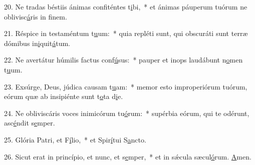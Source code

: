 20. Ne tradas béstiis ánimas confiténtes t\uline{i}bi,~* et ánimas páuperum tuórum ne oblivisc\uline{á}ris in f\uline{i}nem.\par 
21. Réspice in testaméntum t\uline{u}um:~* quia repléti sunt, qui obscuráti sunt terræ dómibus in\uline{i}quit\uline{á}tum.\par 
22. Ne avertátur húmilis factus conf\uline{ú}sus:~* pauper et inops laudábunt n\uline{o}men t\uline{u}um.\par 
23. Exsúrge, Deus, júdica causam t\uline{u}am:~* memor esto improperiórum tuórum, eórum quæ ab insipiénte sunt t\uline{o}ta d\uline{i}e.\par 
24. Ne obliviscáris voces inimicórum tu\uline{ó}rum:~* supérbia eórum, qui te odérunt, asc\uline{é}ndit s\uline{e}mper.\par 
25. Glória Patri, et F\uline{í}lio,~* et Spir\uline{í}tui S\uline{a}ncto.\par 
26. Sicut erat in princípio, et nunc, et s\uline{e}mper,~* et in sǽcula sæcul\uline{ó}rum. \uline{A}men.\par 
